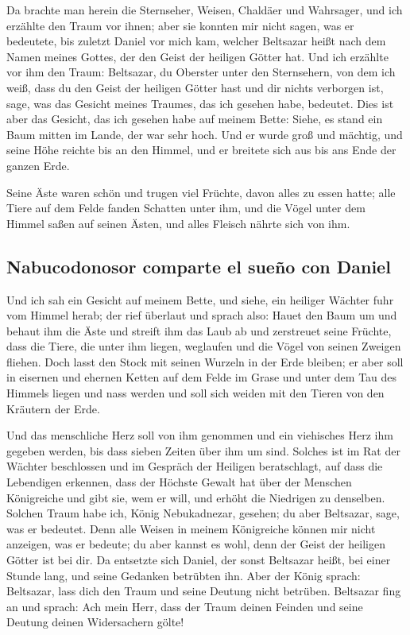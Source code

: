  Da brachte man herein die Sternseher, Weisen, Chaldäer
und Wahrsager, und ich erzählte den Traum vor ihnen; aber sie konnten
mir nicht sagen, was er bedeutete,  bis zuletzt Daniel vor
mich kam, welcher Beltsazar heißt nach dem Namen meines Gottes, der den
Geist der heiligen Götter hat. Und ich erzählte vor ihm den Traum:
 Beltsazar, du Oberster unter den Sternsehern, von dem ich
weiß, dass du den Geist der heiligen Götter hast und dir nichts
verborgen ist, sage, was das Gesicht meines Traumes, das ich gesehen
habe, bedeutet.  Dies ist aber das Gesicht, das ich
gesehen habe auf meinem Bette: Siehe, es stand ein Baum mitten im Lande,
der war sehr hoch.  Und er wurde groß und mächtig, und
seine Höhe reichte bis an den Himmel, und er breitete sich aus bis ans
Ende der ganzen Erde.

 Seine Äste waren schön und trugen viel Früchte, davon
alles zu essen hatte; alle Tiere auf dem Felde fanden Schatten unter
ihm, und die Vögel unter dem Himmel saßen auf seinen Ästen, und alles
Fleisch nährte sich von ihm.

\hypertarget{nabucodonosor-comparte-el-sueuxf1o-con-daniel}{%
\subsection{Nabucodonosor comparte el sueño con
Daniel}\label{nabucodonosor-comparte-el-sueuxf1o-con-daniel}}

 Und ich sah ein Gesicht auf meinem Bette, und siehe, ein
heiliger Wächter fuhr vom Himmel herab;  der rief
überlaut und sprach also: Hauet den Baum um und behaut ihm die Äste und
streift ihm das Laub ab und zerstreuet seine Früchte, dass die Tiere,
die unter ihm liegen, weglaufen und die Vögel von seinen Zweigen
fliehen.  Doch lasst den Stock mit seinen Wurzeln in der
Erde bleiben; er aber soll in eisernen und ehernen Ketten auf dem Felde
im Grase und unter dem Tau des Himmels liegen und nass werden und soll
sich weiden mit den Tieren von den Kräutern der Erde.

 Und das menschliche Herz soll von ihm genommen und ein
viehisches Herz ihm gegeben werden, bis dass sieben Zeiten über ihm um
sind.  Solches ist im Rat der Wächter beschlossen und im
Gespräch der Heiligen beratschlagt, auf dass die Lebendigen erkennen,
dass der Höchste Gewalt hat über der Menschen Königreiche und gibt sie,
wem er will, und erhöht die Niedrigen zu denselben. 
Solchen Traum habe ich, König Nebukadnezar, gesehen; du aber Beltsazar,
sage, was er bedeutet. Denn alle Weisen in meinem Königreiche können mir
nicht anzeigen, was er bedeute; du aber kannst es wohl, denn der Geist
der heiligen Götter ist bei dir.  Da entsetzte sich
Daniel, der sonst Beltsazar heißt, bei einer Stunde lang, und seine
Gedanken betrübten ihn. Aber der König sprach: Beltsazar, lass dich den
Traum und seine Deutung nicht betrüben. Beltsazar fing an und sprach:
Ach mein Herr, dass der Traum deinen Feinden und seine Deutung deinen
Widersachern gölte!

